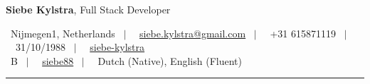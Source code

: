 \begin{center}
{\Large \textbf{Siebe Kylstra}, Full Stack Developer}

\vspace{\headerSpacing}

{\small \faMapMarker \ Nijmegen1, Netherlands \ $|$ \ \faEnvelope \ \href{mailto:siebe.kylstra@gmail.com}{siebe.kylstra@gmail.com} \ $|$ \ \faPhone \ +31 615871119 \ $|$ \ \faCalendar \ 31/10/1988 \ $|$ \ \faLinkedin \ \href{https://linkedin.com/in/siebe-kylstra}{siebe-kylstra} \\ \faCar \ B \ $|$ \ \faGithub \ \href{https://github.com/siebe88}{siebe88} \ $|$ \ \faGlobe \ Dutch (Native), English (Fluent)}
\end{center}
\vspace{\headerRuleSpacing}
\rule{\textwidth}{}

